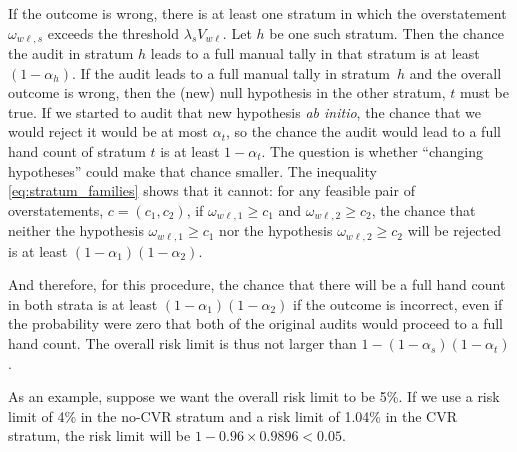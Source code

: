 If the outcome is wrong, there is at least one stratum in which the overstatement $\omega_{w\ell,s}$ 
exceeds the threshold $\lambda_s V_{w\ell}$.
Let $h$ be one such stratum. 
Then the chance the audit in stratum $h$ leads to a full manual tally in that stratum
is at least $(1-\alpha_h)$.
If the audit leads to a full manual tally in stratum~$h$ and the overall outcome is wrong,
then the (new) null hypothesis in the other stratum, $t$ must be true.
If we started to audit that new hypothesis \emph{ab initio}, the chance that we would reject it
would be at most $\alpha_t$, so the chance the audit would lead to a full hand count 
of stratum $t$ is at least $1-\alpha_t$.
The question is whether ``changing hypotheses'' could make that chance smaller.
The inequality \ref{eq:stratum_families} shows that it cannot: for any feasible pair of
overstatements, $c = (c_1, c_2)$, if $\omega_{w\ell,1} \ge c_1$ and $\omega_{w\ell,2} \ge c_2$,
the chance that neither the hypothesis $\omega_{w\ell,1} \ge c_1$ nor the hypothesis 
$\omega_{w\ell,2} \ge c_2$ will be rejected is at least $(1-\alpha_1)(1-\alpha_2)$.

And therefore, for this procedure, the chance that there will be a full hand count in both strata is at least 
$(1-\alpha_1)(1-\alpha_2)$ if the outcome is incorrect,
even if the probability were zero that both of the original audits would proceed to a full hand count.
The overall risk limit is thus not larger than $1 - (1-\alpha_s)(1-\alpha_t)$.

As an example, suppose we want the overall risk limit to be 5\%. 
If we use a risk limit of 4\% in the no-CVR stratum and a risk limit of 1.04\% in the CVR stratum,
the risk limit will be $1 - 0.96\times 0.9896 < 0.05$.

